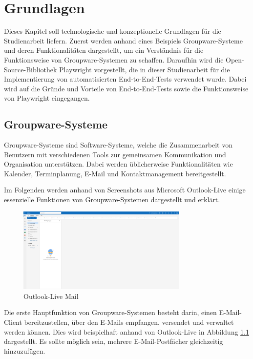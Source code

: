\chapter{Grundlagen}

Dieses Kapitel soll technologische und konzeptionelle Grundlagen für die Studienarbeit liefern.
Zuerst werden anhand eines Beispiels Groupware-Systeme und deren Funktionalitäten dargestellt, um ein Verständnis für die Funktionsweise von Groupware-Systemen zu schaffen.
Daraufhin wird die Open-Source-Bibliothek Playwright vorgestellt, die in dieser Studienarbeit für die Implementierung von automatisierten End-to-End-Tests verwendet wurde.
Dabei wird auf die Gründe und Vorteile von End-to-End-Tests sowie die Funktionsweise von Playwright eingegangen.

\section{Groupware-Systeme}

Groupware-Systeme sind Software-Systeme, welche die Zusammenarbeit von Benutzern mit verschiedenen Tools zur gemeinsamen Kommunikation und Organisation unterstützen.
Dabei werden üblicherweise Funktionalitäten wie Kalender, Terminplanung, E-Mail und Kontaktmanagement bereitgestellt.

Im Folgenden werden anhand von Screenshots aus Microsoft Outlook-Live einige essenzielle Funktionen von Groupware-Systemen dargestellt und erklärt.
\begin{figure}[H]
    \centering
    \includegraphics[width=0.75\textwidth]{images/OutlookLive_Mail1.png}
    \caption{Outlook-Live Mail}
    \label{fig:outlook-live-mail}
\end{figure}
Die erste Hauptfunktion von Groupware-Systemen besteht darin, einen E-Mail-Client bereitzustellen, über den E-Mails empfangen, versendet und verwaltet werden können. Dies wird beispielhaft anhand von Outlook-Live in Abbildung \ref{fig:outlook-live-mail} dargestellt.
Es sollte möglich sein, mehrere E-Mail-Postfächer gleichzeitig hinzuzufügen.


